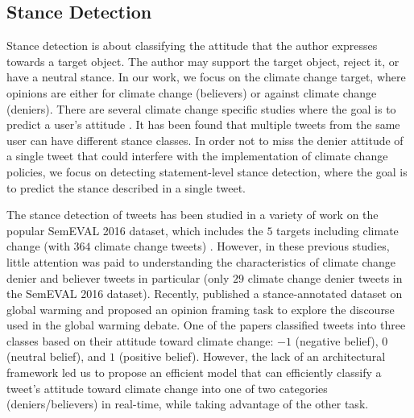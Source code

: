 \documentclass[letterpaper]{article} %
\begin{document}
\subsection{Stance Detection}
Stance detection is about classifying the attitude that the author expresses towards a target object. The author may support the target object, reject it, or have a neutral stance. %
In our work, we focus on the climate change target, where opinions are either for climate change (believers) or against climate change (deniers). There are several climate change specific studies where the goal is to predict a user's attitude \cite{chen2019detecting,tyagi2020polarizing}. It has been found that multiple tweets from the same user can have different stance classes. In order not to miss the denier attitude of a single tweet that could interfere with the implementation of climate change policies, we focus on detecting statement-level stance detection, where the goal is to predict the stance described in a single tweet.
\par \noindent The stance detection of tweets has been studied in a variety of work on the popular SemEVAL 2016 dataset, which includes the $5$ targets including climate change (with $364$ climate change tweets) \cite{vychegzhanin2021new,wang2020neural}. However, in these previous studies, little attention was paid to understanding the characteristics of climate change denier and believer tweets in particular (only $29$ climate change denier tweets in the SemEVAL 2016 dataset). Recently, \cite{luo2020detecting} published a stance-annotated dataset on global warming and proposed an opinion framing task to explore the discourse used in the global warming debate. One of the papers \cite{kabaghe66classifying} classified tweets into three classes based on their attitude toward climate change: $-1$ (negative belief), $0$ (neutral belief), and $1$ (positive belief). However, the lack of an architectural framework led us to propose an efficient model that can efficiently classify a tweet's attitude toward climate change into one of two categories (deniers/believers) in real-time, while taking advantage of the other task.
\end{document}
